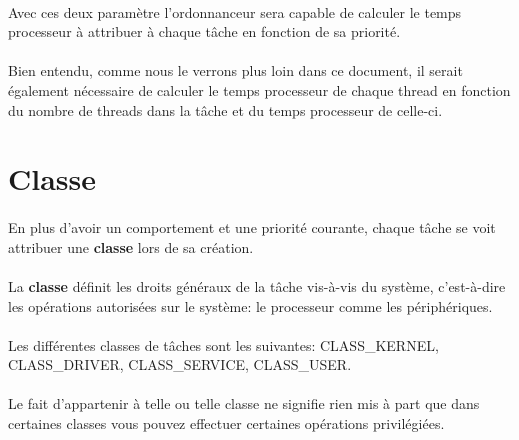 \documentclass[10pt,a4wide]{article}
\begin{document}
\paragraph{}

Avec ces deux param\`etre l'ordonnanceur sera capable de calculer le temps
processeur \`a attribuer \`a chaque t\^ache en fonction de sa priorit\'e.

\paragraph{}

Bien entendu, comme nous le verrons plus loin dans ce document, il serait
\'egalement n\'ecessaire de calculer le temps processeur de chaque thread
en fonction du nombre de threads dans la t\^ache et du temps processeur
de celle-ci.

\section{Classe}

\paragraph{}

En plus d'avoir un comportement et une priorit\'e courante, chaque
t\^ache se voit attribuer une \textbf{classe} lors de sa cr\'eation.

\paragraph{}

La \textbf{classe} d\'efinit les droits g\'en\'eraux de la t\^ache
vis-\`a-vis du syst\`eme, c'est-\`a-dire les op\'erations autoris\'ees
sur le syst\`eme: le processeur comme les p\'eriph\'eriques.

\paragraph{}

Les diff\'erentes classes de t\^aches sont les suivantes: CLASS\_KERNEL,
CLASS\_DRIVER, CLASS\_SERVICE, CLASS\_USER.

\paragraph{}

Le fait d'appartenir \`a telle ou telle classe ne signifie rien mis \`a
part que dans certaines classes vous pouvez effectuer certaines op\'erations
privil\'egi\'ees.
\end{document}
